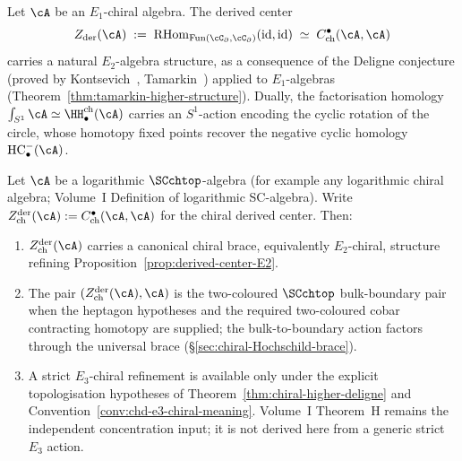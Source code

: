 \begin{proposition}%
\label{prop:derived-center-E2}%
%
%
Let $\cA$ be an $E_1$-chiral algebra. The derived center
\[
Z_{\mathrm{der}}(\cA)
\;:=\;
\mathrm{RHom}_{\mathrm{Fun}(\cC_\partial,\cC_\partial)}(\mathrm{id},\mathrm{id})
\;\simeq\;
C^\bullet_{\mathrm{ch}}(\cA,\cA)
\]
carries a natural $E_2$-algebra structure, as a
consequence of the Deligne conjecture
\textup{(}proved by
Kontsevich~\textup{\cite{Kon03}},
Tamarkin~\textup{\cite{Tamarkin00}}\textup{)}
applied to $E_1$-algebras
\textup{(}Theorem~\textup{\ref{thm:tamarkin-higher-structure}}\textup{)}.
Dually, the factorisation homology
$\int_{S^1}\cA\simeq\HH^{\mathrm{ch}}_\bullet(\cA)$
carries an $S^1$-action encoding the cyclic rotation of
the circle, whose homotopy fixed points recover the
negative cyclic homology $\mathrm{HC}^-_\bullet(\cA)$.
\end{proposition}

\begin{theorem}%
\label{thm:chiral-higher-deligne-hoch-echo}%
\label{thm:chiral-higher-deligne-hoch}%
%
%
%
Let $\cA$ be a logarithmic $\SCchtop$-algebra (for example any
logarithmic chiral algebra; Volume~I Definition of logarithmic
SC-algebra). Write
$Z^{\mathrm{der}}_{\mathrm{ch}}(\cA):=
C^\bullet_{\mathrm{ch}}(\cA,\cA)$ for the chiral derived center.
Then:
\begin{enumerate}
 \item[\textup{(i)}] $Z^{\mathrm{der}}_{\mathrm{ch}}(\cA)$ carries a
 canonical chiral brace, equivalently $E_2$-chiral, structure
 refining Proposition~\ref{prop:derived-center-E2}.
 \item[\textup{(ii)}] The pair
 $(Z^{\mathrm{der}}_{\mathrm{ch}}(\cA),\cA)$ is the two-coloured
 $\SCchtop$ bulk-boundary pair when the heptagon hypotheses and the
 required two-coloured cobar contracting homotopy are supplied; the
 bulk-to-boundary action factors through the universal brace
 (\S\ref{sec:chiral-Hochschild-brace}).
 \item[\textup{(iii)}] A strict $E_3$-chiral refinement is available
 only under the explicit topologisation hypotheses of
 Theorem~\ref{thm:chiral-higher-deligne} and
 Convention~\ref{conv:chd-e3-chiral-meaning}. Volume~I Theorem~H
 remains the independent concentration input; it is not derived here
 from a generic strict $E_3$ action.
\end{enumerate}
\end{theorem}


